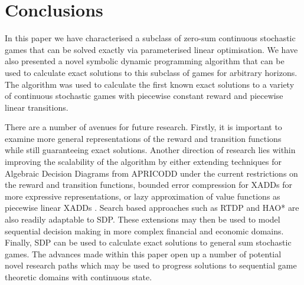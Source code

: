 \section{Conclusions}
\label{sec:conclusion}


In this paper we have characterised a subclass of zero-sum continuous stochastic
games that can be solved exactly via parameterised linear optimisation. 
We have also presented a novel symbolic dynamic programming 
algorithm that can be used to calculate exact solutions to this subclass
of games for arbitrary horizons. The algorithm was used to calculate the first known 
exact solutions to a variety of continuous stochastic games with piecewise constant reward
and piecewise linear transitions.


There are a number of avenues for future research. Firstly, it is important
to examine more general representations of the reward and transition functions while
still guaranteeing exact solutions. Another direction of research lies within
improving the scalability of the algorithm by either extending techniques for Algebraic
Decision Diagrams \cite{Bahar_JoFMiSD_1993} from APRICODD \cite{St-Aubin_NIPS_2000} under 
the current restrictions on the reward and transition functions, bounded error compression for 
XADDs \cite{Vianna_UAI_2013} for more expressive representations, or lazy 
approximation of value functions as piecewise linear XADDs \cite{Li_AAAI_2005}. 
Search based approaches such as RTDP \cite{Barto_AI_1995} and HAO* \cite{Meuleau_JoAIR_2009}
are also readily adaptable to SDP. These extensions may then be used to model sequential decision making in 
more complex financial and economic domains. Finally, SDP can be
used to calculate exact solutions to general sum stochastic games. The advances
made within this paper open up a number of potential novel research paths
which may be used to progress solutions to sequential game theoretic domains
with continuous state.
